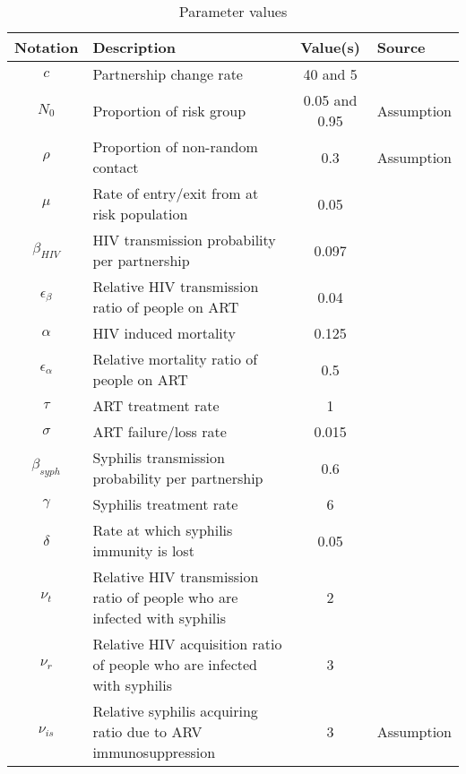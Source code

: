 \begin{table}[ht]
\caption{Parameter values}
\centering
\begin{tabular}{c p{2in} c l}
\hline 
Notation & Description & Value(s) & Source\\
\hline 
$c$ & Partnership change rate & 40 and 5 & \cite{garnett1997natural} \\
$N_0$ & Proportion of risk group & 0.05 and 0.95 & Assumption \\
$\rho$ & Proportion of non-random contact & 0.3 & Assumption\\
$\mu$ & Rate of entry/exit from at risk population & 0.05 & \cite{garnett1997natural} \\
$\beta_{HIV}$ & HIV transmission probability per partnership & 0.097 & \cite{grant1987infectivity}\\
$\epsilon_\beta$ & Relative HIV transmission ratio of people on ART & 0.04 & \cite{cohen2011prevention}\\
$\alpha$ & HIV induced mortality & 0.125 & \cite{champredon2013hiv}\\
$\epsilon_\alpha$ & Relative mortality ratio of people on ART & 0.5 & \cite{ray2010effect}\\
$\tau$ & ART treatment rate & 1 & \cite{granich2009universal} \\
$\sigma$ & ART failure/loss rate & 0.015 & \cite{granich2009universal} \\
$\beta_{syph}$ & Syphilis transmission probability per partnership & 0.6 & \cite{garnett1997natural} \\
$\gamma$ & Syphilis treatment rate & 6 & \cite{grassly2005host} \\
$\delta$ & Rate at which syphilis immunity is lost & 0.05 & \cite{grassly2005host}\\
$\nu_t$ & Relative HIV transmission ratio of people who are infected with syphilis & 2 & \cite{deschamps1996heterosexual}\\
$\nu_r$ & Relative HIV acquisition ratio of people who are infected with syphilis & 3 & \cite{rottingen2001systematic}\\
$\nu_{is}$ & Relative syphilis acquiring ratio due to ARV immunosuppression & 3 & Assumption\\
\hline
\end{tabular}
\label{table:parmsTable}
\end{table}



